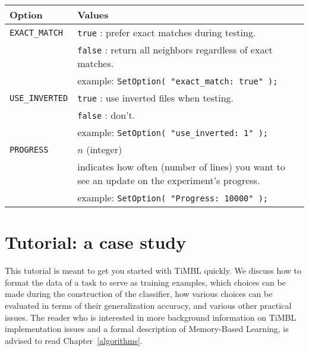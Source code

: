 \documentclass{report}
\begin{document}
\begin{tabular}{|l|p{12cm}|}
\hline
Option & Values\\
\hline
{\tt EXACT\_MATCH} & {\tt true} : prefer exact matches during testing.\\
		  & {\tt false} : return all neighbors regardless of exact matches.\\
		  & example: {\tt SetOption( "exact\_match: true" );}\\
\hline
{\tt USE\_INVERTED}& {\tt true} : use inverted files when testing.\\
		  & {\tt false} : don't.\\
		  & example: {\tt SetOption(  "use\_inverted: 1" );}\\
\hline
{\tt PROGRESS}    & $n$ (integer)\\
		  & indicates how often (number of lines) you want to 
		    see an update on the experiment's progress.\\
		  & example: {\tt SetOption( "Progress: 10000" );}\\
\hline
\end{tabular}




\appendix

\chapter{Tutorial: a case study}
\label{tutorial}

This tutorial is meant to get you started with TiMBL quickly. We
discuss how to format the data of a task to serve as training
examples, which choices can be made during the construction of the
classifier, how various choices can be evaluated in terms of their
generalization accuracy, and various other practical issues. The
reader who is interested in more background information on TiMBL
implementation issues and a formal description of Memory-Based
Learning, is advised to read Chapter~\ref{algorithms}.
\end{document}
